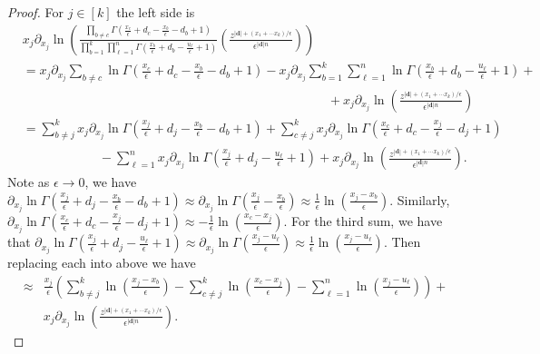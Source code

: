 \documentclass[12pt]{article}
\theoremstyle{plain}
\theoremstyle{definition}
\newcommand{\db}{\boldsymbol{d}}
\begin{document}
\begin{proof}
For $j\in [k]$ the left side is 
\begin{align*}
    &x_j \partial_{x_j} \ln \left(\frac{\prod_{b\neq c} {\Gamma \left(\frac{x_c}{\epsilon}+d_c - \frac{x_b}{\epsilon} - d_b+1 \right)}  }{\prod_{b=1} ^k  \prod_{\ell=1} ^n \Gamma \left(\frac{x_b}{\epsilon}+d_b- \frac{u_\ell}{\epsilon}+1\right)}\left(\frac{ z^{|\db|+(x_1+\cdots x_k)/\epsilon} }{\epsilon^{|\db| n}}\right)\right)\\
    &= x_j \partial_{x_j}\sum_{b\neq c}   \ln \Gamma \left(\frac{x_c}{\epsilon}+d_c - \frac{x_b}{\epsilon} - d_b+1 \right) - x_j \partial_{x_j}\sum_{b=1} ^k \sum_{\ell=1}^n  \ln \Gamma \left(\frac{x_b}{\epsilon}+d_b- \frac{u_\ell}{\epsilon}+1\right)+\\
    &\hspace{4in}+ x_j \partial_{x_j} \ln \left(\frac{ z^{|\db|+(x_1+\cdots x_k)/\epsilon} }{\epsilon^{|\db| n}}\right)\\
    &=\sum_{b\neq j} ^k x_j \partial_{x_j}    \ln \Gamma \left(\frac{x_j}{\epsilon}+d_j - \frac{x_b}{\epsilon} - d_b+1 \right) + \sum_{c\neq j} ^k x_j \partial_{x_j}    \ln \Gamma \left(\frac{x_c}{\epsilon}+d_c - \frac{x_j}{\epsilon} - d_j+1 \right) \\
    &\hspace{1in}-  \sum_{\ell=1}^n   x_j \partial_{x_j} \ln \Gamma \left(\frac{x_j}{\epsilon}+d_j- \frac{u_\ell}{\epsilon}+1\right)+  x_j \partial_{x_j} \ln \left(\frac{ z^{|\db|+(x_1+\cdots x_k)/\epsilon} }{\epsilon^{|\db| n}}\right). 
\end{align*}
Note as $\epsilon \to 0$, we have $\partial_{x_j} \ln \Gamma \left(\frac{x_j}{\epsilon}+d_j - \frac{x_b}{\epsilon} - d_b+1 \right)\approx\partial_{x_j} \ln \Gamma \left(\frac{x_j}{\epsilon} - \frac{x_b}{\epsilon}  \right)\approx \frac{1}{\epsilon}\ln(\frac{x_j-x_b}{\epsilon})$. Similarly, $\partial_{x_j} \ln \Gamma \left(\frac{x_c}{\epsilon}+d_c - \frac{x_j}{\epsilon} - d_j+1 \right)\approx -\frac{1}{\epsilon}\ln(\frac{x_c-x_j}{\epsilon})$. For the third sum, we have that $\partial_{x_j} \ln \Gamma \left(\frac{x_j}{\epsilon}+d_j- \frac{u_\ell}{\epsilon}+1\right) \approx \partial_{x_j} \ln \Gamma \left(\frac{x_j-u_\ell}{\epsilon}\right) \approx \frac{1}{\epsilon}\ln\left(\frac{x_j-u_\ell}{\epsilon}\right)$. Then replacing each into above we have
\begin{align*}
    \approx &\frac{x_j}{\epsilon}\left(\sum_{b\neq j} ^k    \ln  \left(\frac{x_j-x_b}{\epsilon} \right) -\sum_{c\neq j} ^k    \ln  \left(\frac{x_c-x_j}{\epsilon} \right)   -  \sum_{\ell=1}^n   \ln  \left(\frac{x_j-u_\ell}{\epsilon}\right)\right)+ \\
    &x_j \partial_{x_j} \ln \left(\frac{ z^{|\db|+(x_1+\cdots x_k)/\epsilon} }{\epsilon^{|\db| n}}\right).
\end{align*}


\end{proof}
\end{document}
